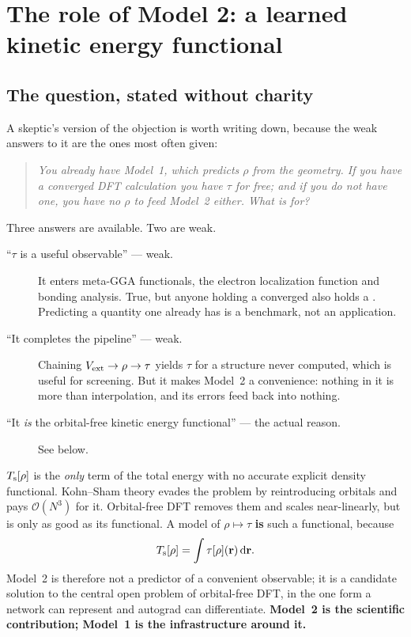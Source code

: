 \chapter{The role of Model 2: a learned kinetic energy functional}
\label{ch:model2}

\section{The question, stated without charity}

A skeptic's version of the objection is worth writing down, because the weak
answers to it are the ones most often given:

\begin{quote}
\itshape
You already have Model~1, which predicts $\rho$ from the geometry. If you have
a converged DFT calculation you have $\tau$ for free; and if you do not have
one, you have no $\rho$ to feed Model~2 either. What is 
\emph{for}?
\end{quote}

Three answers are available. Two are weak.

\begin{description}
  \item[``$\tau$ is a useful observable'' --- weak.] It enters meta-GGA
    functionals, the electron localization function and bonding analysis. True,
    but anyone holding a converged  also holds a .
    Predicting a quantity one already has is a benchmark, not an application.
  \item[``It completes the pipeline'' --- weak.] Chaining
    $V_{\mathrm{ext}}\to\rho\to\tau$ yields $\tau$ for a structure never computed, which
    is useful for screening. But it makes Model~2 a convenience: nothing in it
    is more than interpolation, and its errors feed back into nothing.
  \item[``It \emph{is} the orbital-free kinetic energy functional'' --- the
    actual reason.] See below.
\end{description}

$T_{\mathrm{s}}[\rho]$ is the \emph{only} term of the total energy with no accurate
explicit density functional. Kohn--Sham theory evades the problem by
reintroducing orbitals and pays $\mathcal{O}(N^3)$ for it. Orbital-free DFT
removes them and scales near-linearly, but is only as good as its functional.
A model of $\rho\mapsto\tau$ \textbf{is} such a functional, because
\begin{equation}
  T_{\mathrm{s}}[\rho] = \int \tau[\rho](\mathbf{r})\,\mathrm{d}\mathbf{r} .
\end{equation}
Model~2 is therefore not a predictor of a convenient observable; it is a
candidate solution to the central open problem of orbital-free DFT, in the one
form a network can represent and autograd can differentiate. \textbf{Model~2 is
the scientific contribution; Model~1 is the infrastructure around it.}

